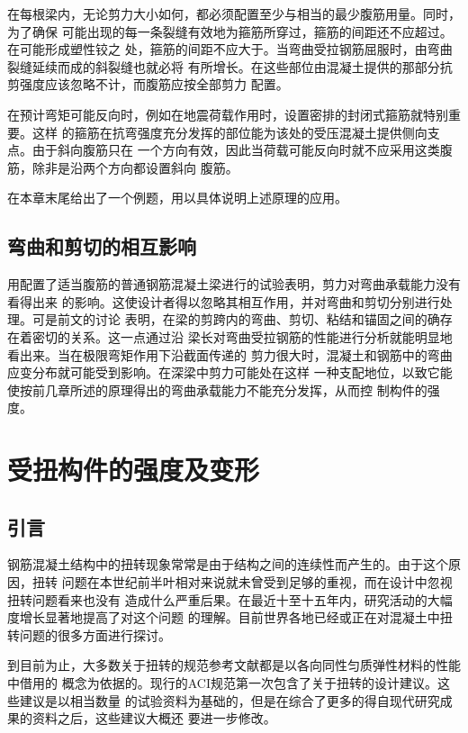 \documentclass[12pt,a4paper]{book}
\begin{document}
在每根梁内，无论剪力大小如何，都必须配置至少与相当的最少腹筋用量。同时，为了确保
可能出现的每一条裂缝有效地为箍筋所穿过，箍筋的间距还不应超过。在可能形成塑性铰之
处，箍筋的间距不应大于。当弯曲受拉钢筋屈服时，由弯曲裂缝延续而成的斜裂缝也就必将
有所增长。在这些部位由混凝土提供的那部分抗剪强度应该忽略不计，而腹筋应按全部剪力
配置。

在预计弯矩可能反向时，例如在地震荷载作用时，设置密排的封闭式箍筋就特别重要。这样
的箍筋在抗弯强度充分发挥的部位能为该处的受压混凝土提供侧向支点。由于斜向腹筋只在
一个方向有效，因此当荷载可能反向时就不应采用这类腹筋，除非是沿两个方向都设置斜向
腹筋。

在本章末尾给出了一个例题，用以具体说明上述原理的应用。

\section{弯曲和剪切的相互影响}

用配置了适当腹筋的普通钢筋混凝土梁进行的试验表明，剪力对弯曲承载能力没有看得出来
的影响。这使设计者得以忽略其相互作用，并对弯曲和剪切分别进行处理。可是前文的讨论
表明，在梁的剪跨内的弯曲、剪切、粘结和锚固之间的确存在着密切的关系。这一点通过沿
梁长对弯曲受拉钢筋的性能进行分析就能明显地看出来。当在极限弯矩作用下沿截面传递的
剪力很大时，混凝土和钢筋中的弯曲应变分布就可能受到影响。在深梁中剪力可能处在这样
一种支配地位，以致它能使按前几章所述的原理得出的弯曲承载能力不能充分发挥，从而控
制构件的强度。

\chapter{受扭构件的强度及变形}

\section{引言}

钢筋混凝土结构中的扭转现象常常是由于结构之间的连续性而产生的。由于这个原因，扭转
问题在本世纪前半叶相对来说就未曾受到足够的重视，而在设计中忽视扭转问题看来也没有
造成什么严重后果。在最近十至十五年内，研究活动的大幅度增长显著地提高了对这个问题
的理解。目前世界各地已经或正在对混凝土中扭转问题的很多方面进行探讨。

到目前为止，大多数关于扭转的规范参考文献都是以各向同性匀质弹性材料的性能中借用的
概念为依据的。现行的ACI规范第一次包含了关于扭转的设计建议。这些建议是以相当数量
的试验资料为基础的，但是在综合了更多的得自现代研究成果的资料之后，这些建议大概还
要进一步修改。
\end{document}
